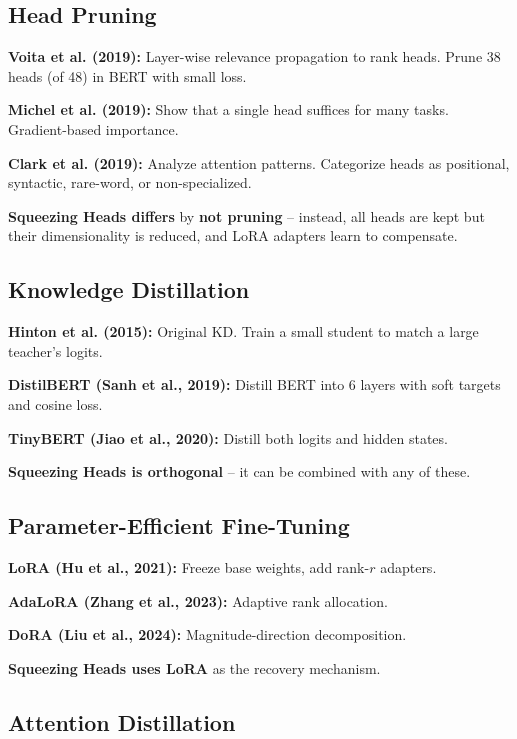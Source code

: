 \subsection{Head Pruning}

\textbf{Voita et al. (2019):} Layer-wise relevance propagation to rank heads. 
Prune 38 heads (of 48) in BERT with small loss.

\textbf{Michel et al. (2019):} Show that a single head suffices for many tasks. 
Gradient-based importance.

\textbf{Clark et al. (2019):} Analyze attention patterns. Categorize heads as 
positional, syntactic, rare-word, or non-specialized.

\textbf{Squeezing Heads differs} by \textbf{not pruning} -- instead, all heads are 
kept but their dimensionality is reduced, and LoRA adapters learn to 
compensate.

\subsection{Knowledge Distillation}

\textbf{Hinton et al. (2015):} Original KD. Train a small student to match a 
large teacher's logits.

\textbf{DistilBERT (Sanh et al., 2019):} Distill BERT into 6 layers with soft 
targets and cosine loss.

\textbf{TinyBERT (Jiao et al., 2020):} Distill both logits and hidden states.

\textbf{Squeezing Heads is orthogonal} -- it can be combined with any of these.

\subsection{Parameter-Efficient Fine-Tuning}

\textbf{LoRA (Hu et al., 2021):} Freeze base weights, add rank-$r$ adapters.

\textbf{AdaLoRA (Zhang et al., 2023):} Adaptive rank allocation.

\textbf{DoRA (Liu et al., 2024):} Magnitude-direction decomposition.

\textbf{Squeezing Heads uses LoRA} as the recovery mechanism.

\subsection{Attention Distillation}

